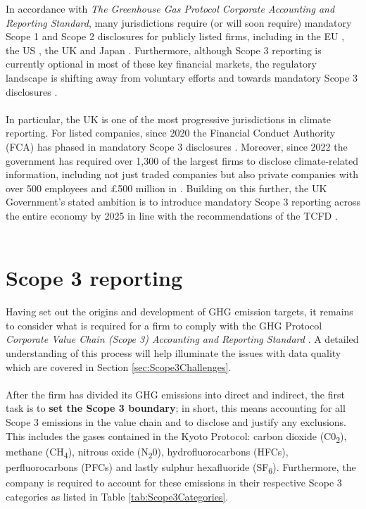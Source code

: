 \documentclass[12pt,twoside]{report}
\begin{document}
In accordance with \textit{The Greenhouse Gas Protocol Corporate Accounting and Reporting Standard}, many jurisdictions require (or will soon require) mandatory Scope 1 and Scope 2 disclosures for publicly listed firms, including in the EU \cite{eu20232772}, the US \cite{sec2024}, the UK \cite{ukleg2013} and Japan \cite{fsa2022}. Furthermore, although Scope 3 reporting is currently optional in most of these key financial markets, the regulatory landscape is shifting away from voluntary efforts and towards mandatory Scope 3 disclosures \cite{ftserussell2024}. 
\\ \\
In particular, the UK is one of the most progressive jurisdictions in climate reporting. For listed companies, since 2020 the Financial Conduct Authority (FCA) has phased in mandatory Scope 3 disclosures \cite{fca2020, fca2021}. Moreover, since 2022 the government has required over 1,300 of the largest firms to disclose climate-related information, including not just traded companies but also private companies with over 500 employees and £500 million in  \cite{UK2021}. Building on this further, the UK Government's stated ambition is to introduce mandatory Scope 3 reporting across the entire economy by 2025 in line with the recommendations of the TCFD \cite{ukgov2020}. 
\\ \\
\section{Scope 3 reporting} \label{sec:Scope3Reporting}
Having set out the origins and development of GHG emission targets, it remains to consider what is required for a firm to comply with the GHG Protocol \textit{Corporate Value Chain (Scope 3) Accounting and Reporting Standard} \cite{ghgscope32013}. A detailed understanding of this process will help illuminate the issues with data quality which are covered in Section \ref{sec:Scope3Challenges}.
\\ \\
After the firm has divided its GHG emissions into direct and indirect, the first task is to \textbf{set the Scope 3 boundary}; in short, this means accounting for all Scope 3 emissions in the value chain and to disclose and justify any exclusions. This includes the gases contained in the Kyoto Protocol: carbon dioxide (C0\textsubscript{2}), methane (CH\textsubscript{4}), nitrous oxide (N\textsubscript{2}0), hydrofluorocarbons (HFCs), perfluorocarbons (PFCs) and lastly sulphur hexafluoride (SF\textsubscript{6}). Furthermore, the company is required to account for these emissions in their respective Scope 3 categories as listed in Table \ref{tab:Scope3Categories}. 
\end{document}
